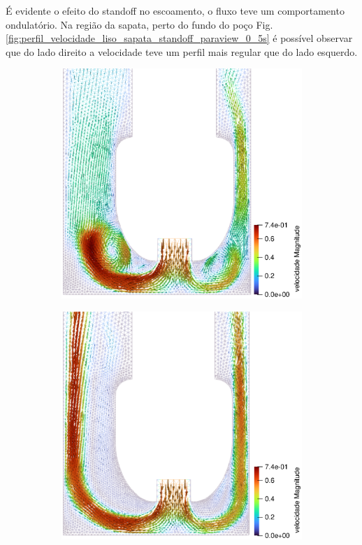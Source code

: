É evidente o efeito do standoff no escoamento, o fluxo teve um comportamento ondulatório. Na região da sapata, perto do fundo do poço Fig. \ref{fig:perfil_velocidade_liso_sapata_standoff_paraview_0_5s} é possível observar que do lado direito a velocidade teve um perfil mais regular que do lado esquerdo. 
     
\begin{figure}[H]
        \centering
        \begin{subfigure}[b]{0.42\linewidth}
    		\includegraphics[width=\linewidth]{img/perfil_vel/liso/perfil_de_vel_sapata_standoff_paraview_0.5s.eps}
    	\end{subfigure}
    	\begin{subfigure}[b]{0.42\linewidth}
    		\includegraphics[width=\linewidth]{img/perfil_vel/liso/perfil_de_vel_sapata_standoff_paraview_10s.eps}

\end{subfigure}
\end{figure}
